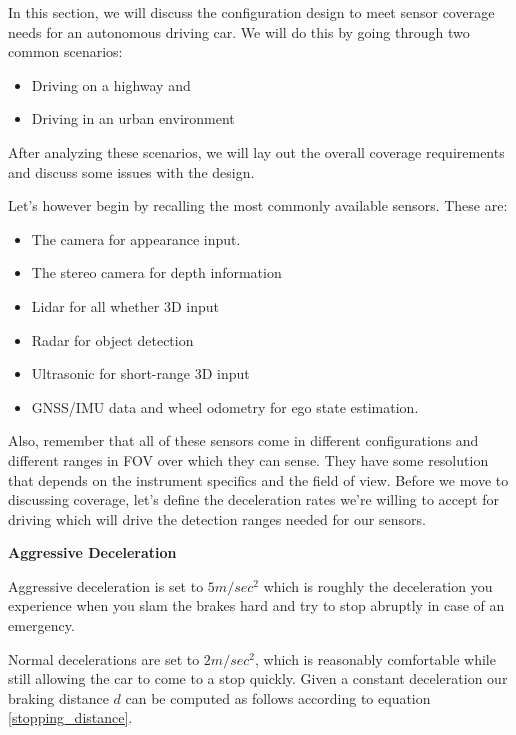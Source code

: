 In this section, we will discuss the configuration design to meet sensor coverage needs for an autonomous driving car. 
We will do this by going through two common scenarios:

\begin{itemize}
\item Driving on a highway and 
\item Driving in an urban environment
\end{itemize}
 
After analyzing these scenarios, we will lay out the overall coverage requirements and discuss some issues with the design. 

Let's however begin by recalling the most commonly available sensors. These are:

\begin{itemize}
\item The camera for appearance input. 
\item The stereo camera for depth information
\item Lidar for all whether 3D input
\item Radar for object detection
\item Ultrasonic for short-range 3D input 
\item GNSS/IMU data and wheel odometry for ego state estimation. 
\end{itemize}

Also, remember that all of these sensors come in different configurations and  different ranges in FOV over which they can sense. 
They have some resolution that depends on the instrument specifics and the field of view. Before we move to discussing coverage, let's define the deceleration rates we're willing to accept for driving which will drive the detection ranges needed for our sensors. 


\begin{framed}
\theoremstyle{remark}
\begin{remark}{\textbf{Aggressive Deceleration}}

Aggressive deceleration is set to $5 m/sec^2$ which is roughly the deceleration you experience when you slam the brakes hard and try to stop abruptly in case of an emergency. 
\end{remark}
\end{framed}

Normal decelerations are set to $2 m/sec^2$, which is reasonably comfortable while still allowing the car to come to a stop quickly. 
Given a constant deceleration our braking distance $d$ can be computed as follows according to equation \ref{stopping_distance}.

